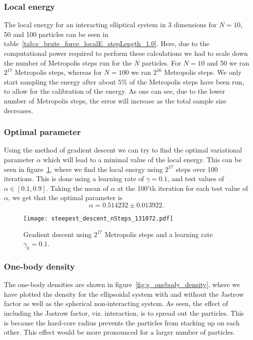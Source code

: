 \documentclass[
    a4paper, aps, twocolumn, floatfix, superscriptaddress,
    nofootinbib]{revtex4-1}
\begin{document}
\subsubsection{Local energy}
The local energy for an interacting elliptical system in 3 dimensions for $N=10$, 50 and 100 particles can be seen in table~\ref{tab:e_brute_force_localE_stepLength_1.0}. Here, due to the computational power required to perform these calculations we had to scale down the number of Metropolis steps run for the $N$ particles. For $N=10$ and 50 we ran $2^{17}$ Metropolis steps, whereas for $N=100$ we ran $2^{16}$ Metropolis steps. We only start sampling the energy after about $5\%$ of the Metropolis steps have been run, to allow for the calibration of the energy.
As one can see, due to the lower number of Metropolis steps, the error will increase as the total sample size decreases.


\subsubsection{Optimal parameter}
Using the method of gradient descent we can try to find the optimal variational parameter $\alpha$ which will lead to a minimal value of the local energy. This can be seen in figure~\ref{fig:f_gradient_descent}, where we find the local energy using $2^{17}$ steps over 100 iterations. This is done using a learning rate of $\gamma = 0.1$, and test values of $\alpha \in [0.1, 0.9]$.
Taking the mean of $\alpha$ at the 100'th iteration for each test value of $\alpha$, we get that the optimal parameter is $$\alpha = 0.514232 \pm 0.013922.$$
\begin{figure}[h!]
    \centering
    \texttt{[image: steepest\_descent\_nSteps\_131072.pdf]}
    \caption{Gradient descent using $2^{17}$ Metropolis steps and a learning rate $\gamma_k = 0.1$.}
    \label{fig:f_gradient_descent}
\end{figure}

\subsubsection{One-body density}
The one-body densities are shown in figure~\ref{fig:g_onebody_density}, where we have plotted the density for the ellipsoidal system with and without the Jastrow factor as well as the spherical non-interacting system. As seen, the effect of including the Jastrow factor, viz. interaction, is to spread out the particles. This is because the hard-core radius prevents the particles from stacking up on each other. This effect would be more pronounced for a larger number of particles. 
\end{document}

